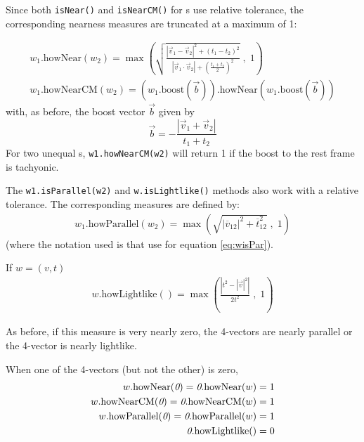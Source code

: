 Since both {\tt isNear()} and {\tt isNearCM()} for \LV s use relative tolerance,
the corresponding nearness measures are truncated at a maximum of 1:

\begin{eqnarray}
\label{eq:whowNear}
  w_1 \mbox{.howNear} (w_2) = \max \left( \sqrt { \frac
    {\left| \vec{v}_1 - \vec{v}_2 \right| ^2 + (t_1 - t_2)^2 }
    { \left| \vec{v}_1 \cdot \vec{v}_2 \right|
      + \left( \frac{t_1 + t_2}{2} \right)^2 }
  } \;, \; 1 \right)
	\\
\label{eq:whowNearCM}
  w_1 \mbox{.howNearCM} (w_2) =
    \left( w_1\mbox{.boost}(\vec{b}) \right)\mbox{.howNear}
    \left( w_1\mbox{.boost}(\vec{b}) \right)
\end{eqnarray}
\noindent
with, as before, the boost vector $\vec{b}$ given by
\[
  \vec{b} = - \frac { \left| \vec{v}_1 + \vec{v}_2 \right| } { t_1 + t_2 }
\]
\noindent
For two unequal \LV s,
{\tt w1.howNearCM(w2)} will return 1
if the boost to the rest frame is tachyonic.

The {\tt w1.isParallel(w2)}
and {\tt w.isLightlike()}
methods also work with a relative tolerance.
The corresponding measures are defined by:
\begin{eqnarray}
\label{eq:whowPar}
  w_1\mbox{.howParallel}(w_2) = \max \left( \sqrt {
    \left| \overline{v}_{12} \right| ^2 +
	\overline{t}_{12}^2 } \; , \; 1 \right)
\end{eqnarray}
\noindent
(where the notation used is that use for equation \ref{eq:wisPar}).

\noindent
If $w = (v,t)$
\begin{eqnarray}
\label{eq:whowLl}
  w\mbox{.howLightlike}() = \max \left(
    \frac { \left| t^2 - |\vec{v}|^2 \right| } { 2 t^2 }
     \; , \; 1 \right)
\end{eqnarray}

\noindent
As before, if this measure is very nearly zero, the 4-vectors are nearly
parallel or the 4-vector is nearly lightlike.

When one of the 4-vectors (but not the other) is zero,
\begin{eqnarray}
\label{eq:whowNear:2}
  w \mbox{.howNear}(\mbox{{\it 0}}) =
  \mbox{{\it 0}} \mbox{.howNear} (w) = 1
	\\
\label{eq:whowNearCM:2}
  w \mbox{.howNearCM}(\mbox{{\it 0}}) =
  \mbox{{\it 0}} \mbox{.howNearCM} (w) = 1
	\\
\label{eq:whowPar:2}
  w \mbox{.howParallel}(\mbox{{\it 0}}) =
  \mbox{{\it 0}} \mbox{.howParallel} (w) = 1
	\\
\label{eq:whowLl:2}
  \mbox{{\it 0}} \mbox{.howLightlike()} = 0
\end{eqnarray}

